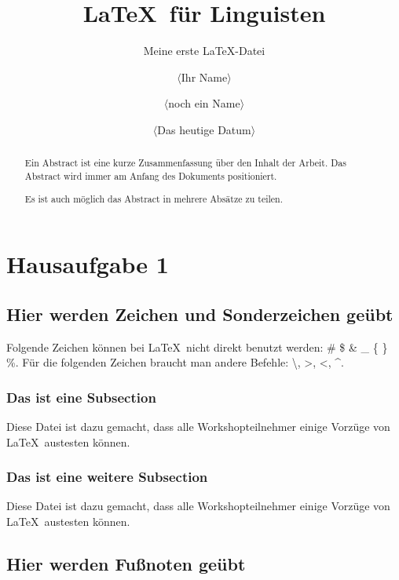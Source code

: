 \documentclass[10pt,paper=a4,abstracton]{scrartcl}
\author{$\langle$Ihr Name$\rangle$ \and $\langle$noch ein Name$\rangle$}
\title{\LaTeX\ für Linguisten}
\subtitle{Meine erste \LaTeX -Datei}
\date{$\langle$Das heutige Datum$\rangle$}
\begin{document}
\maketitle

\begin{abstract}
	Ein Abstract ist eine kurze Zusammenfassung über den Inhalt 
	der Arbeit. Das Abstract wird immer am Anfang des Dokuments 
	positioniert.
	
	Es ist auch möglich das Abstract in mehrere Absätze
	zu teilen.
\end{abstract}

\tableofcontents

\listoffigures

\listoftables


\section{Hausaufgabe 1}


\subsection[Zeichen und Sonderzeichen]{Hier werden Zeichen und Sonderzeichen geübt}

Folgende Zeichen können bei \LaTeX\ nicht direkt benutzt werden: \# \$ \& \_ \{ \} \%. Für die folgenden Zeichen braucht man andere Befehle: \textbackslash, \textgreater , \textless , \textasciicircum .


\subsubsection[Erste Subsection]{Das ist eine Subsection}

Diese Datei ist dazu gemacht, dass alle Workshopteilnehmer einige Vorzüge von \LaTeX\ austesten können.


\subsubsection[Zweite Subsection]{Das ist eine weitere Subsection}

Diese Datei ist dazu gemacht, dass alle Workshopteilnehmer einige Vorzüge von \LaTeX\ austesten können.


\subsection[Fußnoten]{Hier werden Fußnoten geübt}
\end{document}

